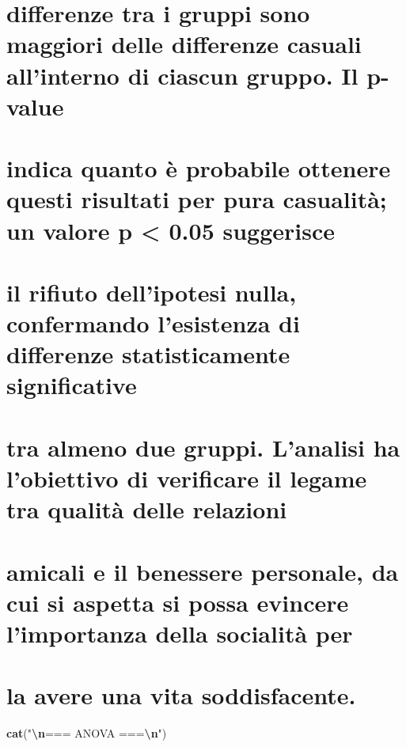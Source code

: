 \documentclass[
]{article}
\newenvironment{Shaded}{\begin{snugshade}}{\end{snugshade}}
\newcommand{\FunctionTok}[1]{\textcolor[rgb]{0.13,0.29,0.53}{\textbf{#1}}}
\newcommand{\NormalTok}[1]{#1}
\newcommand{\SpecialCharTok}[1]{\textcolor[rgb]{0.81,0.36,0.00}{\textbf{#1}}}
\newcommand{\StringTok}[1]{\textcolor[rgb]{0.31,0.60,0.02}{#1}}
\begin{document}
\section{differenze tra i gruppi sono maggiori delle differenze casuali
all'interno di ciascun gruppo. Il
p-value}\label{differenze-tra-i-gruppi-sono-maggiori-delle-differenze-casuali-allinterno-di-ciascun-gruppo.-il-p-value}

\section{indica quanto è probabile ottenere questi risultati per pura
casualità; un valore p \textless{} 0.05
suggerisce}\label{indica-quanto-uxe8-probabile-ottenere-questi-risultati-per-pura-casualituxe0-un-valore-p-0.05-suggerisce}

\section{il rifiuto dell'ipotesi nulla, confermando l'esistenza di
differenze statisticamente
significative}\label{il-rifiuto-dellipotesi-nulla-confermando-lesistenza-di-differenze-statisticamente-significative}

\section{tra almeno due gruppi. L'analisi ha l'obiettivo di verificare
il legame tra qualità delle
relazioni}\label{tra-almeno-due-gruppi.-lanalisi-ha-lobiettivo-di-verificare-il-legame-tra-qualituxe0-delle-relazioni}

\section{amicali e il benessere personale, da cui si aspetta si possa
evincere l'importanza della socialità
per}\label{amicali-e-il-benessere-personale-da-cui-si-aspetta-si-possa-evincere-limportanza-della-socialituxe0-per}

\section{la avere una vita
soddisfacente.}\label{la-avere-una-vita-soddisfacente.}

\begin{Shaded}
\begin{Highlighting}[]
\FunctionTok{cat}\NormalTok{(}\StringTok{"}\SpecialCharTok{\textbackslash{}n}\StringTok{=== ANOVA ===}\SpecialCharTok{\textbackslash{}n}\StringTok{"}\NormalTok{)}
\end{Highlighting}
\end{Shaded}
\end{document}
